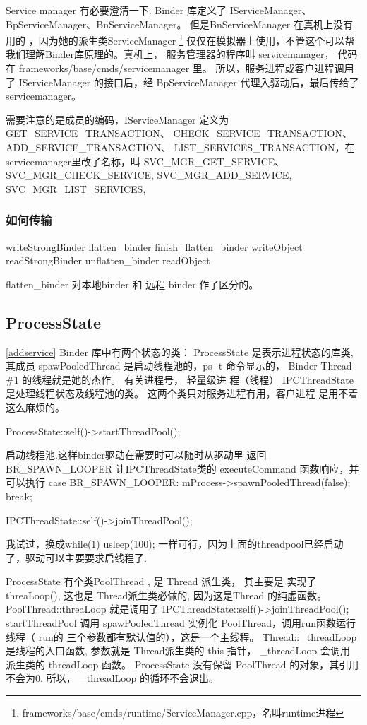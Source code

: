 \documentclass[a4paper,11pt]{article}
\begin{document}
    Service manager 有必要澄清一下. Binder 库定义了 IServiceManager、
    BpServiceManager、BnServiceManager。 但是BnServiceManager 在真机上没有用的
    ，因为她的派生类ServiceManager
    \footnote{frameworks/base/cmds/runtime/ServiceManager.cpp，名叫runtime进程}
    仅仅在模拟器上使用，不管这个可以帮我们理解Binder库原理的。真机上， 服务管理器的程序叫 servicemanager， 代码在 
    frameworks/base/cmds/servicemanager 里。 所以，服务进程或客户进程调用了
    IServiceManager 的接口后，经 BpServiceManager 代理入驱动后，最后传给了
    servicemanager。

    需要注意的是成员的编码，IServiceManager 定义为 GET_SERVICE_TRANSACTION、
    CHECK_SERVICE_TRANSACTION、ADD_SERVICE_TRANSACTION、
    LIST_SERVICES_TRANSACTION，在servicemanager里改了名称，叫
    SVC_MGR_GET_SERVICE、SVC_MGR_CHECK_SERVICE, SVC_MGR_ADD_SERVICE, SVC_MGR_LIST_SERVICES,

\subsubsection{如何传输}
writeStrongBinder flatten_binder finish_flatten_binder writeObject 
readStrongBinder unflatten_binder readObject


flatten_binder 对本地binder 和 远程 binder 作了区分的。
\subsection{ProcessState}
\ref{addservice}
Binder 库中有两个状态的类：
ProcessState 是表示进程状态的库类, 其成员 spawPooledThread 是启动线程池的，ps
-t 命令显示的， Binder Thread \#1 的线程就是她的杰作。 有关进程号， 轻量级进
程（线程）
IPCThreadState 是处理线程状态及线程池的类。 这两个类只对服务进程有用，客户进程
是用不着这么麻烦的。

ProcessState::self()->startThreadPool(); 

  启动线程池.这样binder驱动在需要时可以随时从驱动里
  返回 BR_SPAWN_LOOPER 让IPCThreadState类的
  executeCommand 函数响应，并可以执行
  case BR_SPAWN_LOOPER:
  mProcess->spawnPooledThread(false);
  break;


    IPCThreadState::self()->joinThreadPool();
    
    我试过，换成while(1) usleep(100); 一样可行，因为上面的threadpool已经启动
    了，驱动可以主要要求启线程了.

ProcessState 有个类PoolThread , 是 Thread 派生类， 其主要是 实现了
threaLoop(), 这也是 Thread派生类必做的, 因为这是Thread 的纯虚函数。
PoolThread::threaLoop 就是调用了  
    IPCThreadState::self()->joinThreadPool();
startThreadPool 调用 spawPooledThread  实例化 PoolThread，调用run函数运行线程（ run的
三个参数都有默认值的），这是一个主线程。
Thread::_threadLoop 是线程的入口函数, 参数就是 Thread派生类的 this 指针，
_threadLoop 会调用 派生类的 threadLoop 函数。 ProcessState 没有保留 PoolThread
的对象，其引用不会为0. 所以， _threadLoop 的循环不会退出。
\end{document}
